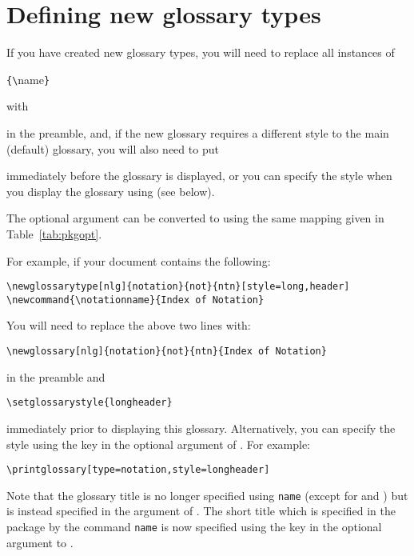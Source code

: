 \documentclass{nlctdoc}
\newenvironment{oldway}{%
  \begin{labelledbox}{\styfmt{glossary}}\ttfamily\obeylines
}{%
  \end{labelledbox}%
}
\newenvironment{newway}{%
  \begin{labelledbox}{\styfmt{glossaries}}\ttfamily\obeylines
}{%
  \end{labelledbox}%
}
\begin{document}
\section{Defining new glossary types}

If you have created new glossary types, you will need to 
replace all instances of
\begin{oldway}
\newline
{}\verb|{\|name\verb|}|
\end{oldway}%
with
\begin{newway}
\end{newway}%
in the preamble, and, if the new glossary requires a different style
to the main (default) glossary, you will also need to put
\begin{newway}
\end{newway}%
immediately before the glossary is displayed, or you can specify
the style when you display the glossary using 
(see below). 

The  optional argument can be converted to
 using the same mapping given in 
Table~\ref{tab:pkgopt}.

For example, if your document contains the following:
\begin{verbatim}
\newglossarytype[nlg]{notation}{not}{ntn}[style=long,header]
\newcommand{\notationname}{Index of Notation}
\end{verbatim}
You will need to replace the above two lines with:
\begin{verbatim}
\newglossary[nlg]{notation}{not}{ntn}{Index of Notation}
\end{verbatim}
in the preamble and
\begin{verbatim}
\setglossarystyle{longheader}
\end{verbatim}
immediately prior to displaying this glossary. Alternatively, you
can specify the style using the  key in
the optional argument of . For example:
\begin{verbatim}
\printglossary[type=notation,style=longheader]
\end{verbatim}

Note that the glossary title is no longer specified using
\cs{}\texttt{name} (except for 
and ) but is instead specified in the 
argument of . The short title which is specified in
the  package by the command
\texttt{name} is now specified using
the  key in the optional argument to
.
\end{document}

